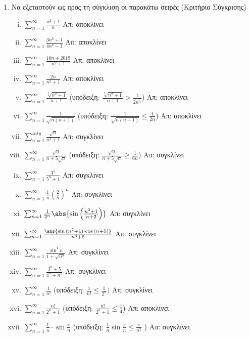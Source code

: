 \begin{enumerate}
    \item Να εξεταστούν ως προς τη σύγκλιση οι παρακάτω σειρές (Κριτήριο Σύγκρισης)
        \begin{enumerate}[i)]
            \item $ \sum_{n=1}^{\infty} \frac{n^{2}+1}{n} $ \hfill Απ: αποκλίνει 
            \item $ \sum_{n=1}^{\infty} \frac{3n^{3}+1}{4n^{4}-1} $ \hfill Απ: 
                αποκλίνει
            \item $ \sum_{n=1}^{\infty} \frac{10n+2019}{n^{2}+1} $ 
                \hfill Απ: αποκλίνει
            \item $ \sum_{n=1}^{\infty} \frac{2n}{n^{2}+1} $ \hfill Απ: αποκλίνει 
            \item $ \sum_{n=1}^{\infty} \frac{\sqrt[3]{n^{2}+1}}{n+1} $ 
                \qquad (υπόδειξη: $ \frac{\sqrt[3]{n^{2}+1}}{n+1} > 
                \frac{1}{2n^{\frac{1}{3} }} $) \hfill Απ: αποκλίνει 
            \item $ \sum_{n=1}^{\infty} \frac{1}{\sqrt{n(n+1)}} $ \qquad 
                (υπόδειξη: $ \frac{1}{\sqrt{n(n+1)}} \leq \frac{1}{2n}  $) 
                \hfill Απ: αποκλίνει 
            \item $ \sum_{n=1}^{inty} \frac{\sqrt{n}}{n^{3}+1} $ \hfill Απ: συγκλίνει 
            \item $ \sum_{n=1}^{\infty} \frac{\sqrt{n}}{n+5 \sqrt{n}} $ \qquad 
                (υπόδειξη: $ \frac{\sqrt{n}}{n+5 \sqrt{n}} \geq   
                \frac{1}{6n} $) \hfill Απ: συγκλίνει 
            \item $ \sum_{n=1}^{\infty} \frac{3^{n}}{5^{n}+1} $ \hfill Απ: συγκλίνει 
            \item $ \sum_{n=1}^{\infty} \frac{1}{n} \left(\frac{2}{5} \right)^{n} $ 
                \hfill Απ: συγκλίνει
            \item $ \sum_{n=1}^{\infty} \frac{1}{2^{n}} 
                \abs{\sin{\left(\frac{n^{2}+1}{n+2}\right)}} $ \hfill Απ: συγκλίνει 
            \item $ \sum_{n=1}^{\infty} \frac{\abs{\sin{(n^{2}+1)} \cdot 
                \cos{(n+5)}}}{n^{4}+5} $ \hfill Απ: συγκλίνει 
            \item $ \sum_{n=1}^{\infty} \frac{\sin^{4}n}{1+ \sqrt{n^{5}}} $
                \hfill Απ: συγκλίνει 
            \item $ \sum_{n=1}^{\infty} \frac{3^{n}+5}{4^{n}+n^{2}} $ \hfill Απ: 
                συγκλίνει
            \item $ \sum_{n=1}^{\infty} \frac{1}{n!} $ \qquad (υπόδειξη: 
                $ \frac{1}{n!} \leq \frac{1}{2^{n}}) $ \hfill Απ: συγκλίνει 
            \item $ \sum_{n=1}^{\infty} \frac{n!}{2^{n}+1} $ \qquad (υπόδειξη: 
                $ \frac{n!}{2^{n}+1} \leq \frac{1}{4} $) \hfill Απ: αποκλίνει 
            \item $ \sum_{n=1}^{\infty} \frac{1}{n} \cdot \sin{\frac{\pi}{n}} $ 
                \qquad (υπόδειξη: $ \frac{1}{n} \sin{\frac{\pi}{n}} \leq 
                \frac{\pi}{n^{2}} $ ) \hfill Απ: συγκλίνει 
        \end{enumerate}


\end{enumerate}
